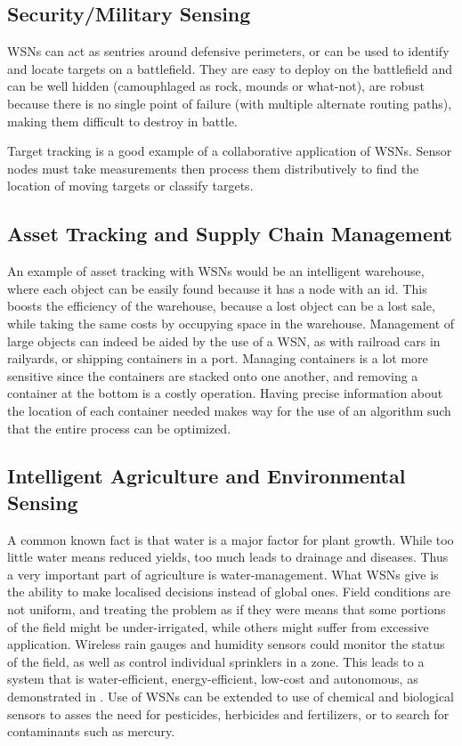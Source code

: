 \subsection{Security/Military Sensing}

WSNs can act as sentries around defensive perimeters, or can be used to identify and locate targets on a battlefield. They are easy to deploy on
the battlefield and can be well hidden (camouphlaged as rock, mounds or what-not), are robust because there is no single point of failure (with
multiple alternate routing paths), making them difficult to destroy in battle.

Target tracking is a good example of a collaborative application of WSNs. Sensor nodes must take measurements then process them distributively
to find the location of moving targets or classify targets.
\subsection{Asset Tracking and Supply Chain Management}

An example of asset tracking with WSNs would be an intelligent warehouse, where each object can be easily found because it has a node with an id. This
boosts the efficiency of the warehouse, because a lost object can be a lost sale, while taking the same costs by occupying space in the warehouse.
Management of large objects can indeed be aided by the use of a WSN, as with railroad cars in railyards, or shipping containers in a port. Managing
containers is a lot more sensitive since the containers are stacked onto one another, and removing a container at the bottom is a costly operation. Having
precise information about the location of each container needed makes way for the use of an algorithm such that the entire process can be optimized.
\subsection{Intelligent Agriculture and Environmental Sensing}

A common known fact is that water is a major factor for plant growth. While too little water means reduced yields, too much leads to drainage and
diseases. Thus a very important part of agriculture is water-management. What WSNs give is the ability to make localised decisions instead of global ones.
Field conditions are not uniform, and treating the problem as if they were means that some portions of the field might be under-irrigated, while others
might suffer from excessive application. Wireless rain gauges and humidity sensors could monitor the status of the field, as well as control individual 
sprinklers in a zone. This leads to a system that is water-efficient, energy-efficient, low-cost and autonomous, as demonstrated in \cite{Yuns2007}. 
Use of WSNs can be extended to use of chemical and biological sensors to asses the need for pesticides, herbicides and fertilizers, or to search for 
contaminants such as mercury. 

